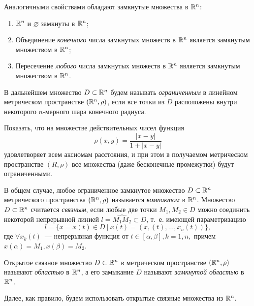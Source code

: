 \documentclass[../../main.tex]{subfiles}
\begin{document}
  Аналогичными свойствами обладают замкнутые множества в $\mathbb{R}^n$:
  \begin{enumerate}
    \item  $\mathbb{R}^n$  и $\varnothing$ замкнуты в $\mathbb{R}^n$;
    \item Объединение \emph{конечного}  числа замкнутых множеств в 
    $\mathbb{R}^n$ является замкнутым множеством в $\mathbb{R}^n$; 
    \item Пересечение \emph{любого} числа замкнутых множеств в $\mathbb{R}^n$ 
    является замкнутым множеством в $\mathbb{R}^n$.
  \end{enumerate} 
  
  
  В дальнейшем множество $D \subset \mathbb{R}^n$ будем называть 
  \emph{ограниченным} в линейном метрическом пространстве $ (\mathbb{R}^n, \rho) $, 
  если все точки из $D$ расположены внутри некоторого $n$-мерного шара 
  конечного радиуса.
  
  \begin{exc}
    Показать, что на множестве действительных чисел функция 
    \[ 
      \rho(x, y) = \frac{|x - y|}{1 + |x - y|}
    \] удовлетворяет всем аксиомам расстояния, и при этом в 
    получаемом метрическом пространстве $ (R, \rho) $ все множества 
    (даже бесконечные промежутки) будут ограниченными.   
   \end{exc} 
 
  \smallskip   
  В общем случае, любое ограниченное замкнутое множество $D \subset 
  \mathbb{R}^n$ метрического пространства $ (\mathbb{R}^n, \rho) $ называется 
  \emph{компактом} в $\mathbb{R}^n$.
  Множество $D \subset \mathbb{R}^n$ считается \emph{связным}, если любые две точки 
  $M_1,M_2 \in D $ можно соединить некоторой непрерывной линией $ l = 
  \widehat{M_1M_2} \subset D$, т.~е. имеющей параметризацию
  \[
    l = \{x = x(t) \in D\ |\ x(t) = (x_1(t), \dots, x_n(t))\},
  \]
  где $\forall x_k(t)$~--- непрерывная функция от $t \in [\alpha, 
  \beta], k = \overline{1,n},$ причем $ x(\alpha) = M_1, x(\beta) = 
  M_2.$
   
  Открытое связное множество $D \subset \mathbb{R}^n$ в метрическом 
  пространстве $ (\mathbb{R}^n, \rho) $ называют \emph{областью} в $\mathbb{R}^n$, а 
  его замыкание $D$ называют \emph{замкнутой областью} в $\mathbb{R}^n$.
   
  Далее, как правило, будем использовать открытые связные множества 
  из $\mathbb{R}^n$.
  
\end{document}
